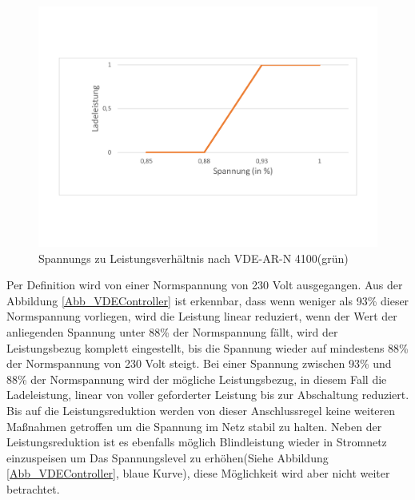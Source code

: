 \begin{figure}[h!]
	\includegraphics[width=\linewidth]{img/Dia2.pdf}
	\caption{Spannungs zu Leistungsverhältnis nach VDE-AR-N 4100(grün)}
	\label{Abb_VDEController2}
\end{figure}
Per Definition wird von einer Normspannung von 230 Volt ausgegangen. Aus der Abbildung \ref{Abb_VDEController} ist erkennbar, dass wenn weniger als 93\% dieser Normspannung vorliegen, wird die Leistung linear reduziert, wenn der Wert der anliegenden Spannung unter 88\% der Normspannung fällt, wird der Leistungsbezug komplett eingestellt, bis die Spannung wieder auf mindestens 88\% der Normspannung von 230 Volt steigt. Bei einer Spannung zwischen 93\% und 88\% der Normspannung wird der mögliche Leistungsbezug, in diesem Fall die Ladeleistung, linear von voller geforderter Leistung bis zur Abschaltung reduziert.\\
Bis auf die Leistungsreduktion werden von dieser Anschlussregel keine weiteren Maßnahmen getroffen um die Spannung im Netz stabil zu halten. 
Neben der Leistungsreduktion ist es ebenfalls möglich Blindleistung wieder in Stromnetz einzuspeisen um Das Spannungslevel zu erhöhen(Siehe Abbildung \ref{Abb_VDEController}, blaue Kurve), diese Möglichkeit wird aber nicht weiter betrachtet.

